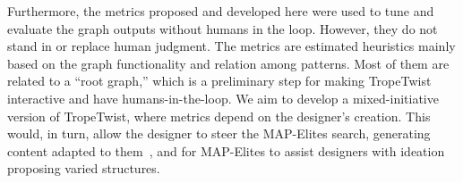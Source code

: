 









Furthermore, the metrics proposed and developed here were used to tune and evaluate the graph outputs without humans in the loop. However, they do not stand in or replace human judgment. The metrics are estimated heuristics mainly based on the graph functionality and relation among patterns. Most of them are related to a ``root graph,'' which is a preliminary step for making TropeTwist interactive and have humans-in-the-loop. We aim to develop a mixed-initiative version of TropeTwist, where metrics depend on the designer's creation. This would, in turn, allow the designer to steer the MAP-Elites search, generating content adapted to them~\cite{p12alvarez_assessing_2021}, and for MAP-Elites to assist designers with ideation proposing varied structures.


 